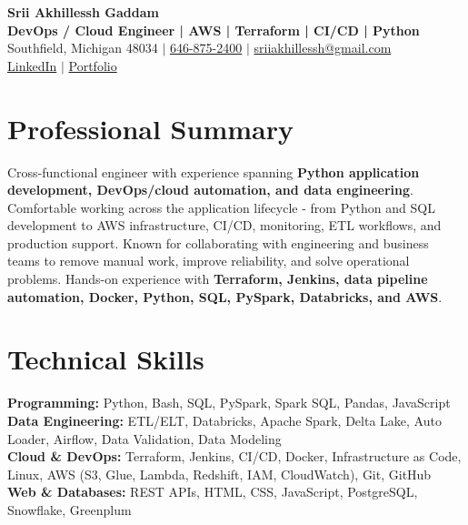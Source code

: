 \documentclass[letterpaper,10pt]{article}
\begin{document}
\fontsize{9.35pt}{10.45pt}\selectfont

\begin{center}
    {\LARGE \textbf{Srii Akhillessh Gaddam}} \\[-1pt]
    \textbf{DevOps / Cloud Engineer | AWS | Terraform | CI/CD | Python} \\[2pt]
    Southfield, Michigan 48034 $|$
    \href{tel:6468752400}{646-875-2400} $|$
    \href{mailto:sriiakhillessh@gmail.com}{sriiakhillessh@gmail.com} \\[1pt]
    \href{https://www.linkedin.com/in/srii-akhiilessh-gaddam-b48668191/}{LinkedIn} $|$
    \href{https://sriiakhillesshg.github.io/portfolio/}{Portfolio}
\end{center}
\vspace{-8pt}

\section{Professional Summary}
\small{Cross-functional engineer with experience spanning \textbf{Python application development, DevOps/cloud automation, and data engineering}. Comfortable working across the application lifecycle - from Python and SQL development to AWS infrastructure, CI/CD, monitoring, ETL workflows, and production support. Known for collaborating with engineering and business teams to remove manual work, improve reliability, and solve operational problems. Hands-on experience with \textbf{Terraform, Jenkins, data pipeline automation, Docker, Python, SQL, PySpark, Databricks, and AWS}.}

\section{Technical Skills}
\small{
\textbf{Programming:} Python, Bash, SQL, PySpark, Spark SQL, Pandas, JavaScript \\
\textbf{Data Engineering:} ETL/ELT, Databricks, Apache Spark, Delta Lake, Auto Loader, Airflow, Data Validation, Data Modeling \\
\textbf{Cloud \& DevOps:} Terraform, Jenkins, CI/CD, Docker, Infrastructure as Code, Linux, AWS (S3, Glue, Lambda, Redshift, IAM, CloudWatch), Git, GitHub \\
\textbf{Web \& Databases:} REST APIs, HTML, CSS, JavaScript, PostgreSQL, Snowflake, Greenplum
}
\end{document}
